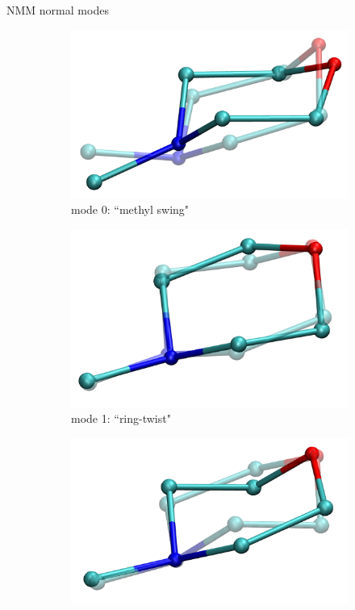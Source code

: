 \documentclass{beamer}
\begin{document}
\begin{frame}{NMM normal modes}
	\newcommand{\x}{0.18}
	\begin{figure}
		\centering
		\begin{subfigure}{\x\textwidth}
			\includegraphics[width=\textwidth]{mode0_ot.png}
			\caption{mode 0: ``methyl swing"}
		\end{subfigure}
		\begin{subfigure}{\x\textwidth}
			\includegraphics[width=\textwidth]{mode1_ot.png}
			\caption{mode 1: ``ring-twist"}
		\end{subfigure}
		\begin{subfigure}{\x\textwidth}
			\includegraphics[width=\textwidth]{mode2_ot.png}

\end{subfigure}
\end{figure}
\end{frame}
\end{document}
